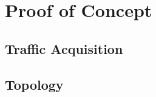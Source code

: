 \section{Proof of Concept}
\label{sec:poc}

\textcolor{dimgray}{\lipsum[1-10]}


\subsection{Traffic Acquisition}
\label{subsec:traffic-acquisition}

\textcolor{dimgray}{\lipsum}


\subsection{Topology}
\label{subsec:topology}

\textcolor{dimgray}{\lipsum}

